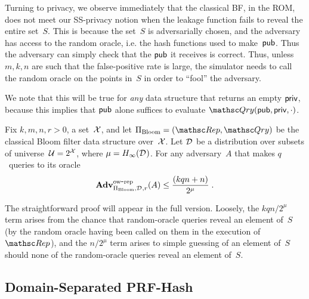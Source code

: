 Turning to privacy, we observe immediately that the classical BF, in the
ROM, does not meet our SS-privacy notion when the leakage function
fails to reveal the entire set~$S$.  This is because the set~$S$ is
adversarially chosen, and the adversary has access to the random
oracle, i.e. the hash functions used to make~${\sf pub}$.  Thus the
adversary can simply check that the ${\sf pub}$ it receives is correct.
Thus, unless $m,k,n$ are such that the false-positive rate is large,
the simulator needs to call the random oracle on the points in~$S$ in order to ``fool'' the adversary.

We note that this will be true for \emph{any} data structure that returns an empty ${\sf priv}$, because this implies that ${\sf pub}$ alone suffices to evaluate $\Qry(\pubaux,\privaux,\cdot)$.

\begin{theorem}\label{thm3}\label{thm:bf-ow}
Fix $k,m,n,r>0$, a set~${\cal X}$, and let $\setprim_{\mathrm{Bloom}}= (\Rep, \Qry)$ be the classical Bloom filter data structure over~${\cal X}$. Let $\mathcal{D}_{}^{}$ be a distribution over subsets of universe~${\cal U}=2^{\cal X}$, where $\mu = H_\infty(\mathcal{D}_{}^{})$.  For any adversary~$A$ that makes $q$~queries to its oracle
\[
\mathrm{\mathbf{Adv}}^{\mathrm{ow\mbox{-}rep}}_{\Pi_{\mathrm{Bloom}},\mathcal{D}_{}^{},r}(A) \leq  \frac{(kqn+n)}{2^{\mu}}\;.
\]
\end{theorem}
The straightforward proof will appear in the full version.
Loosely, the $kqn/2^{\mu}$ term arises from the chance that random-oracle queries reveal an element of~$S$ (by the random oracle having
been called on them in the execution of~$\Rep$), and the $n/2^\mu$
term arises to simple guessing of an element of~$S$ should none of the
random-oracle queries reveal an element of~$S$.


\subsection{Domain-Separated PRF-Hash}

